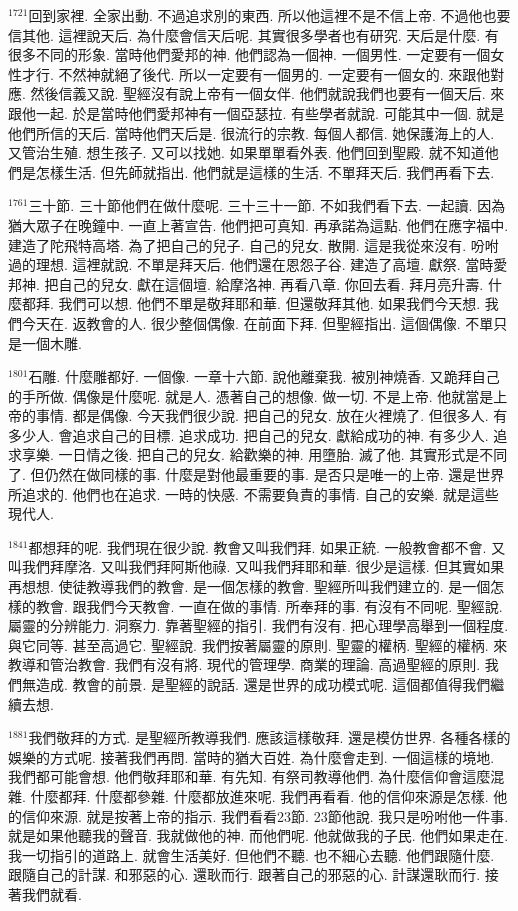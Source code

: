 \documentclass{book}
\begin{document}
$^{1721}$回到家裡.
全家出動.
不過追求別的東西.
所以他這裡不是不信上帝.
不過他也要信其他.
這裡說天后.
為什麼會信天后呢.
其實很多學者也有研究.
天后是什麼.
有很多不同的形象.
當時他們愛邦的神.
他們認為一個神.
一個男性.
一定要有一個女性才行.
不然神就絕了後代.
所以一定要有一個男的.
一定要有一個女的.
來跟他對應.
然後信義又說.
聖經沒有說上帝有一個女伴.
他們就說我們也要有一個天后.
來跟他一起.
於是當時他們愛邦神有一個亞瑟拉.
有些學者就說.
可能其中一個.
就是他們所信的天后.
當時他們天后是.
很流行的宗教.
每個人都信.
她保護海上的人.
又管治生殖.
想生孩子.
又可以找她.
如果單單看外表.
他們回到聖殿.
就不知道他們是怎樣生活.
但先師就指出.
他們就是這樣的生活.
不單拜天后.
我們再看下去.

$^{1761}$三十節.
三十節他們在做什麼呢.
三十三十一節.
不如我們看下去.
一起讀.
因為猶大眾子在晚鐘中.
一直上著宣告.
他們把可真知.
再承諾為這點.
他們在應字福中.
建造了陀飛特高塔.
為了把自己的兒子.
自己的兒女.
散開.
這是我從來沒有.
吩咐過的理想.
這裡就說.
不單是拜天后.
他們還在恩怨子谷.
建造了高壇.
獻祭.
當時愛邦神.
把自己的兒女.
獻在這個壇.
給摩洛神.
再看八章.
你回去看.
拜月亮升壽.
什麼都拜.
我們可以想.
他們不單是敬拜耶和華.
但還敬拜其他.
如果我們今天想.
我們今天在.
返教會的人.
很少整個偶像.
在前面下拜.
但聖經指出.
這個偶像.
不單只是一個木雕.

$^{1801}$石雕.
什麼雕都好.
一個像.
一章十六節.
說他離棄我.
被別神燒香.
又跪拜自己的手所做.
偶像是什麼呢.
就是人.
憑著自己的想像.
做一切.
不是上帝.
他就當是上帝的事情.
都是偶像.
今天我們很少說.
把自己的兒女.
放在火裡燒了.
但很多人.
有多少人.
會追求自己的目標.
追求成功.
把自己的兒女.
獻給成功的神.
有多少人.
追求享樂.
一日情之後.
把自己的兒女.
給歡樂的神.
用墮胎.
滅了他.
其實形式是不同了.
但仍然在做同樣的事.
什麼是對他最重要的事.
是否只是唯一的上帝.
還是世界所追求的.
他們也在追求.
一時的快感.
不需要負責的事情.
自己的安樂.
就是這些現代人.

$^{1841}$都想拜的呢.
我們現在很少說.
教會又叫我們拜.
如果正統.
一般教會都不會.
又叫我們拜摩洛.
又叫我們拜阿斯他祿.
又叫我們拜耶和華.
很少是這樣.
但其實如果再想想.
使徒教導我們的教會.
是一個怎樣的教會.
聖經所叫我們建立的.
是一個怎樣的教會.
跟我們今天教會.
一直在做的事情.
所奉拜的事.
有沒有不同呢.
聖經說.
屬靈的分辨能力.
洞察力.
靠著聖經的指引.
我們有沒有.
把心理學高舉到一個程度.
與它同等.
甚至高過它.
聖經說.
我們按著屬靈的原則.
聖靈的權柄.
聖經的權柄.
來教導和管治教會.
我們有沒有將.
現代的管理學.
商業的理論.
高過聖經的原則.
我們無造成.
教會的前景.
是聖經的說話.
還是世界的成功模式呢.
這個都值得我們繼續去想.

$^{1881}$我們敬拜的方式.
是聖經所教導我們.
應該這樣敬拜.
還是模仿世界.
各種各樣的娛樂的方式呢.
接著我們再問.
當時的猶大百姓.
為什麼會走到.
一個這樣的境地.
我們都可能會想.
他們敬拜耶和華.
有先知.
有祭司教導他們.
為什麼信仰會這麼混雜.
什麼都拜.
什麼都參雜.
什麼都放進來呢.
我們再看看.
他的信仰來源是怎樣.
他的信仰來源.
就是按著上帝的指示.
我們看看23節.
23節他說.
我只是吩咐他一件事.
就是如果他聽我的聲音.
我就做他的神.
而他們呢.
他就做我的子民.
他們如果走在.
我一切指引的道路上.
就會生活美好.
但他們不聽.
也不細心去聽.
他們跟隨什麼.
跟隨自己的計謀.
和邪惡的心.
還耿而行.
跟著自己的邪惡的心.
計謀還耿而行.
接著我們就看.
\end{document}
